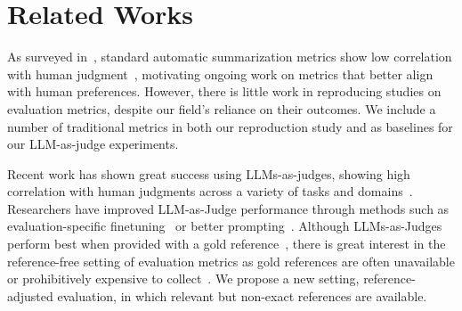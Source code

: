 \section{Related Works}
\label{sec:ch-6-related_work}

As surveyed in~, standard automatic summarization metrics show low correlation with human judgment~\cite{liu2008correlation,fabbri2021summeval}, motivating ongoing work on metrics that better align with human preferences. However, there is little work in reproducing studies on evaluation metrics, despite our field's reliance on their outcomes. We include a number of traditional metrics in both our reproduction study and as baselines for our LLM-as-judge experiments. 

 Recent work has shown great success using LLMs-as-judges, showing high correlation with human judgments across a variety of tasks and domains~\cite{zheng2023judging}. Researchers have improved LLM-as-Judge performance through methods such as evaluation-specific finetuning~\cite{kim2023prometheus} or better prompting~\cite{liu2023geval}. Although LLMs-as-Judges perform best when provided with a gold reference~\cite{Deutsch2022LimitationsReferenceFree}, there is great interest in the reference-free setting of evaluation metrics as gold references are often unavailable or prohibitively expensive to collect~\cite{liu2023geval,vasilyev2020blanc}. We propose a new setting, reference-adjusted evaluation, in which relevant but non-exact references are available.